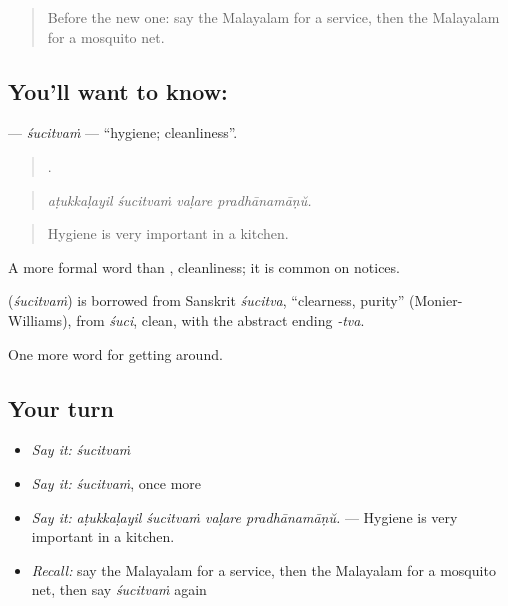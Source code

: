 \label{lesson:ML-C483-sucitvam}



\begin{quote}
Before the new one: say the Malayalam for a service, then the Malayalam for a mosquito net.
\end{quote}

\subsection*{You'll want to know: }
\textbf{} — \emph{śucitvaṁ} — \textquotedblleft{}hygiene; cleanliness\textquotedblright{}.

\begin{quote}
   .
\end{quote}

\begin{quote}
\emph{aṭukkaḷayil śucitvaṁ vaḷare pradhānamāṇŭ.}
\end{quote}

\begin{quote}
Hygiene is very important in a kitchen.
\end{quote}

A more formal word than , cleanliness; it is common on notices.

\begin{cousinweb}
\textbf{} (\emph{śucitvaṁ}) is borrowed from Sanskrit \emph{śucitva}, \textquotedblleft{}clearness, purity\textquotedblright{} (Monier-Williams), from \emph{śuci}, clean, with the abstract ending \emph{-tva}.
\end{cousinweb}

\begin{grammarlens}[title={What you've built}]
One more word for getting around.
\end{grammarlens}

\subsection*{Your turn}
\begin{itemize}
\raggedright
  \item \emph{Say it:} \emph{śucitvaṁ}
  \item \emph{Say it:} \emph{śucitvaṁ}, once more
  \item \emph{Say it:} \emph{aṭukkaḷayil śucitvaṁ vaḷare pradhānamāṇŭ.} — Hygiene is very important in a kitchen.
  \item \emph{Recall:} say the Malayalam for a service, then the Malayalam for a mosquito net, then say \emph{śucitvaṁ} again
\end{itemize}

